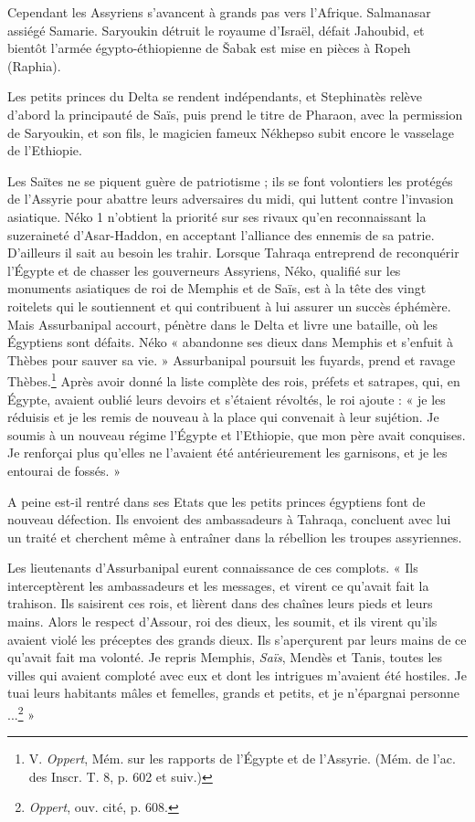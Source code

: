 \documentclass[letterpaper,twocolumn,openany,nodeprecatedcode]{dndbook}
\begin{document}
Cependant les Assyriens s'avancent à grands pas vers l'Afrique. Salmanasar assiégé Samarie. Saryoukin détruit le royaume d'Israël, défait Jahoubid, et bientôt l'armée égypto-éthiopienne de Šabak est mise en pièces à Ropeh (Raphia).

Les petits princes du Delta se rendent indépendants, et Stephinatès relève d'abord la principauté de Saïs, puis prend le titre de Pharaon, avec la permission de Saryoukin, et son fils, le magicien fameux Nékhepso subit encore le vasselage de l'Ethiopie.

Les Saïtes ne se piquent guère de patriotisme ; ils se font volontiers les protégés de l'Assyrie pour abattre leurs adversaires du midi, qui luttent contre l'invasion asiatique. Néko 1 n'obtient la priorité sur ses rivaux qu'en reconnaissant la suzeraineté d'Asar-Haddon, en acceptant l'alliance des ennemis de sa patrie. D'ailleurs il sait au besoin les trahir. Lorsque Tahraqa entreprend de reconquérir l'Égypte et de chasser les gouverneurs Assyriens, Néko, qualifié sur les monuments asiatiques de roi de Memphis et de Saïs, est à la tête des vingt roitelets qui le soutiennent et qui contribuent à lui assurer un succès éphémère. Mais Assurbanipal accourt, pénètre dans le Delta et livre une bataille, où les Égyptiens sont défaits. Néko « abandonne ses dieux dans Memphis et s'enfuit à Thèbes pour sauver sa vie. » Assurbanipal poursuit les fuyards, prend et ravage Thèbes.\footnote{V. \emph{Oppert}, Mém. sur les rapports de l'Égypte et de l'Assyrie. (Mém. de l'ac. des Inscr. T. 8, p. 602 et suiv.)} Après avoir donné la liste complète des rois, préfets et satrapes, qui, en Égypte, avaient oublié leurs devoirs et s'étaient révoltés, le roi ajoute : « je les réduisis et je les remis de nouveau à la place qui convenait à leur sujétion. Je soumis à un nouveau régime l'Égypte et l'Ethiopie, que mon père avait conquises. Je renforçai plus qu'elles ne l'avaient été antérieurement les garnisons, et je les entourai de fossés. »

A peine est-il rentré dans ses Etats que les petits princes égyptiens font de nouveau défection. Ils envoient des ambassadeurs à Tahraqa, concluent avec lui un traité et cherchent même à entraîner dans la rébellion les troupes assyriennes.

Les lieutenants d'Assurbanipal eurent connaissance de ces complots. « Ils interceptèrent les ambassadeurs et les messages, et virent ce qu'avait fait la trahison. Ils saisirent ces rois, et lièrent dans des chaînes leurs pieds et leurs mains. Alors le respect d'Assour, roi des dieux, les soumit, et ils virent qu'ils avaient violé les préceptes des grands dieux. Ils s'aperçurent par leurs mains de ce qu'avait fait ma volonté. Je repris Memphis, \emph{Saïs}, Mendès et Tanis, toutes les villes qui avaient comploté avec eux et dont les intrigues m'avaient été hostiles. Je tuai leurs habitants mâles et femelles, grands et petits, et je n'épargnai personne ...\footnote{\emph{Oppert}, ouv. cité, p. 608.} »
\end{document}
